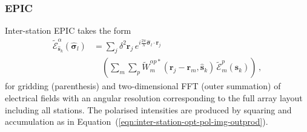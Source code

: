 \documentclass[
  journal=pasa,
  manuscript=article-type,
  year=2020,
  volume=37,
]{cup-journal}
\begin{document}
\subsubsection{EPIC}


Inter-station EPIC takes the form
\begin{align}
  \widetilde{\mathcal{E}}_{\hat{\boldsymbol{s}}_k}^\alpha(\hat{\boldsymbol{\sigma}}_l) &= \sum_j \delta^2 \boldsymbol{r}_j \, e^{i\frac{2\pi}{\lambda} \hat{\boldsymbol{\sigma}}_l\cdot\boldsymbol{r}_j} \nonumber\\
  &\quad \left(\sum_{m} \sum_p \widetilde{W}_{m}^{\alpha p*}(\boldsymbol{r}_j-\boldsymbol{r}_{m},\hat{\boldsymbol{s}}_k) \, \widetilde{\mathcal{E}}_m^p(\hat{\boldsymbol{s}}_k) \right) \, , \label{eqn:inter-station-pol-hol-img-epic-expl}
\end{align}
for gridding (parenthesis) and two-dimensional FFT (outer summation) of electrical fields with an angular resolution corresponding to the full array layout including all stations. The polarised intensities are produced by squaring and accumulation as in Equation~(\ref{eqn:inter-station-opt-pol-img-outprod}).
\end{document}
